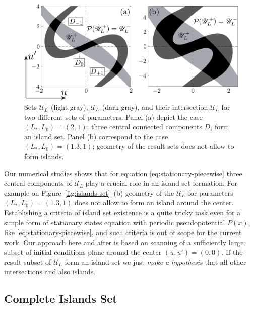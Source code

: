 \begin{figure}[h]
\centering
	\includegraphics[scale = 1]{pic/island set for piecewise equation}
	\caption{
		Sets $\mathscr{U}_L^+$ (light gray), $\mathscr{U}_L^-$ (dark gray), and their intersection $\mathscr{U}_L$ for two different sets of parameters.
		Panel (a) depict the case $(L_*, L_0) = (2, 1)$; three central connected components $D_i$ form an island set.
		Panel (b) correspond to the case $(L_*, L_0) = (1.3, 1)$; geometry of the result sets does not allow to form islands.
	}
\label{fig:island-set-piecewise}
\end{figure}

Our numerical studies shows that for equation \eqref{eq:stationary-piecewise} three central components of $\mathscr{U}_L$ play a crucial role in an island set formation.
For example on Figure~\ref{fig:islands-set}~(b) geometry of the $\mathscr{U}_L^-$ for parameters $(L_*, L_0) = (1.3, 1)$ does not allow to form an island around the center.
Establishing a criteria of island set existence is a quite tricky task even for a simple form of stationary states equation with periodic pseudopotential $P(x)$, like \eqref{eq:stationary-piecewise}, and such criteria is out of scope for the current work.
Our approach here and after is based on scanning of a sufficiently large subset of initial conditions plane around the center $(u, u') = (0, 0)$.
If the result subset of $\mathscr{U}_L$ form an island set we just {\it make a hypothesis} that all other intersections and also islands.

\subsection{Complete Islands Set}

